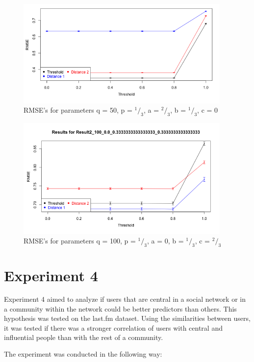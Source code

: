 \begin{figure}[!h]
\includegraphics[width=400px]{./4-experiments/figures/Result2_50_066_033_033.png}
\caption{RMSE's for parameters q = 50, p = $^1 / _3$, a = $^2 / _3$, b = $^1 / _3$, c = 0}
\label{f:result01}
\end{figure}

\begin{figure}[!h]
\includegraphics[width=400px]{./4-experiments/figures/Result2_100_00_033_033.png}
\caption{RMSE's for parameters q = 100, p = $^1 / _3$, a = 0, b = $^1 / _3$, c = $^2 / _3$}
\label{f:result02}
\end{figure}
\section{Experiment 4}
\label{st:experiment4} Experiment 4 aimed to analyze if users that are central in a social network or in a community within the network could be better predictors than others. This hypothesis was tested on the last.fm dataset. Using the similarities between users, it was tested if there was a stronger correlation of users with central and influential people than with the rest of a community.
\newline

The experiment was conducted in the following way:

